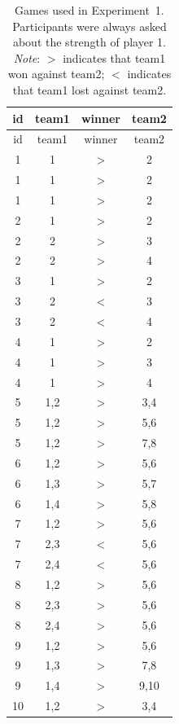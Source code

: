 \documentclass[11pt]{article}
\begin{document}
{\setlength{\tabcolsep}{2pt} 
\begin{longtable}{cccc}

\caption{Games used in Experiment~1. Participants were always asked about the strength of player 1. \emph{Note}: $>$ indicates that team1 won against team2; $<$ indicates that team1 lost against team2.}\\

  \toprule
 id & team1 & winner & team2 \\
  \midrule
  \endfirsthead

  \toprule
 id & team1 & winner & team2 \\
  \midrule
  \endhead
1 & 1 & $>$ & 2 \\ 
  1 & 1 & $>$ & 2 \\ 
  1 & 1 & $>$ & 2 \\ 
\midrule
  2 & 1 & $>$ & 2 \\ 
  2 & 2 & $>$ & 3 \\ 
  2 & 2 & $>$ & 4 \\ 
  \midrule
  3 & 1 & $>$ & 2 \\ 
  3 & 2 & $<$ & 3 \\ 
  3 & 2 & $<$ & 4 \\ 
  \midrule
  4 & 1 & $>$ & 2 \\ 
  4 & 1 & $>$ & 3 \\ 
  4 & 1 & $>$ & 4 \\ 
  \midrule
  5 & 1,2 & $>$ & 3,4 \\ 
  5 & 1,2 & $>$ & 5,6 \\ 
  5 & 1,2 & $>$ & 7,8 \\ 
  \midrule
  6 & 1,2 & $>$ & 5,6 \\ 
  6 & 1,3 & $>$ & 5,7 \\ 
  6 & 1,4 & $>$ & 5,8 \\ 
  \midrule
  7 & 1,2 & $>$ & 5,6 \\ 
  7 & 2,3 & $<$ & 5,6 \\ 
  7 & 2,4 & $<$ & 5,6 \\ 
  \midrule
  8 & 1,2 & $>$ & 5,6 \\ 
  8 & 2,3 & $>$ & 5,6 \\ 
  8 & 2,4 & $>$ & 5,6 \\ 
  \midrule
  9 & 1,2 & $>$ & 5,6 \\ 
  9 & 1,3 & $>$ & 7,8 \\ 
  9 & 1,4 & $>$ & 9,10 \\ 
  \midrule
  10 & 1,2 & $>$ & 3,4 \\ 

\end{longtable}}
\end{document}
